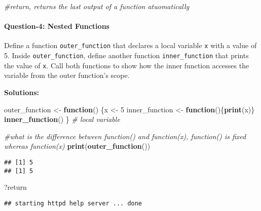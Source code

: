 \documentclass[
]{article}
\newenvironment{Shaded}{\begin{snugshade}}{\end{snugshade}}
\newcommand{\CommentTok}[1]{\textcolor[rgb]{0.56,0.35,0.01}{\textit{#1}}}
\newcommand{\ControlFlowTok}[1]{\textcolor[rgb]{0.13,0.29,0.53}{\textbf{#1}}}
\newcommand{\DecValTok}[1]{\textcolor[rgb]{0.00,0.00,0.81}{#1}}
\newcommand{\FunctionTok}[1]{\textcolor[rgb]{0.13,0.29,0.53}{\textbf{#1}}}
\newcommand{\NormalTok}[1]{#1}
\newcommand{\OtherTok}[1]{\textcolor[rgb]{0.56,0.35,0.01}{#1}}
\begin{document}
\begin{Shaded}
\begin{Highlighting}[]
\CommentTok{\#return, returns the last output of a function atuomatically }
\end{Highlighting}
\end{Shaded}

\hypertarget{question-4-nested-functions}{%
\paragraph{Question-4: Nested
Functions}\label{question-4-nested-functions}}

Define a function \texttt{outer\_function} that declares a local
variable \texttt{x} with a value of 5. Inside \texttt{outer\_function},
define another function \texttt{inner\_function} that prints the value
of \texttt{x}. Call both functions to show how the inner function
accesses the variable from the outer function's scope.

\textbf{Solutions:}

\begin{Shaded}
\begin{Highlighting}[]
\NormalTok{outer\_function }\OtherTok{\textless{}{-}} \ControlFlowTok{function}\NormalTok{() \{x }\OtherTok{\textless{}{-}} \DecValTok{5}
\NormalTok{inner\_function }\OtherTok{\textless{}{-}} \ControlFlowTok{function}\NormalTok{()\{}\FunctionTok{print}\NormalTok{(x)\} }
\FunctionTok{inner\_function}\NormalTok{() \}  }\CommentTok{\# local variable }

\CommentTok{\#what is the difference between function() and function(x), function() is fixed whereas function(x)}
\FunctionTok{print}\NormalTok{(}\FunctionTok{outer\_function}\NormalTok{())}
\end{Highlighting}
\end{Shaded}

\begin{verbatim}
## [1] 5
## [1] 5
\end{verbatim}

\begin{Shaded}
\begin{Highlighting}[]
\NormalTok{?return}
\end{Highlighting}
\end{Shaded}

\begin{verbatim}
## starting httpd help server ... done
\end{verbatim}
\end{document}

